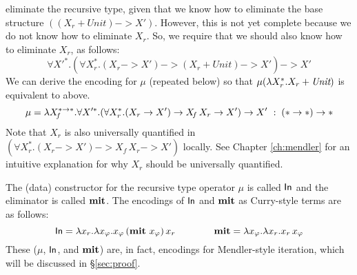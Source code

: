 eliminate the recursive type, given that we know how to eliminate
the base structure $((X_r + \textit{Unit}) -> X')$.
However, this is not yet complete because we do not know how to eliminate $X_r$.
So, we require that we should also know how to eliminate $X_r$, as follows:
\[ \forall X'^{*}.
        (\forall X_r^{*}.(X_r -> X') -> (X_r + \textit{Unit}) -> X') -> X' \]
We can derive the encoding for $\mu$ (repeated below)
so that $\mu(\lambda X_r^{*}.X_r + \textit{Unit})$ is equivalent to above.
\[
\mu =
 \lambda X_{\!f}^{* -> *}.
 \forall X'^{*}.(\forall X_r^{*}.(X_r -> X') -> X_{\!f}\,X_r -> X') -> X'
 ~:\; (* -> *) -> *
\]
Note that $X_r$ is also universally quantified
in $(\forall X_r^{*}.(X_r -> X') -> X_{\!f}\,X_r -> X')$
locally.
See Chapter \ref{ch:mendler} %
for an intuitive explanation for why $X_r$ should be universally quantified.

The (data) constructor for the recursive type operator $\mu$ is called $\mathsf{In}$
and the eliminator is called $\mathbf{mit}$. The encodings of $\mathsf{In}$ and $\mathbf{mit}$ as
Curry-style terms are as follows:
\[ \mathsf{In} = \lambda x_r. \lambda x_\varphi.x_\varphi\,(\mathbf{mit}~x_\varphi)\,x_r
\qquad\qquad \mathbf{mit} = \lambda x_\varphi.\lambda x_r.x_r\,x_\varphi \]
These ($\mu$, $\mathsf{In}$, and $\mathbf{mit}$) are, in fact, encodings for
Mendler-style iteration, which will be discussed in \S\ref{sec:proof}.

